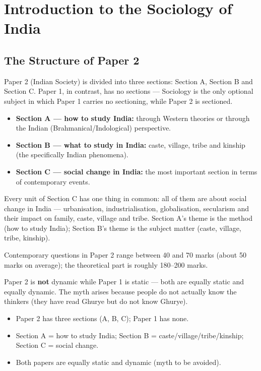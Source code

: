 \chapter{Introduction to the Sociology of India}

\section{The Structure of Paper 2}

Paper 2 (Indian Society) is divided into three sections: Section A, Section B and Section C. Paper 1, in contrast, has no sections --- Sociology is the only optional subject in which Paper 1 carries no sectioning, while Paper 2 is sectioned.

\begin{KeyConcept}
\begin{itemize}
\item \textbf{Section A --- how to study India:} through Western theories or through the Indian (Brahmanical/Indological) perspective.
\item \textbf{Section B --- what to study in India:} caste, village, tribe and kinship (the specifically Indian phenomena).
\item \textbf{Section C --- social change in India:} the most important section in terms of contemporary events.
\end{itemize}
\end{KeyConcept}

Every unit of Section C has one thing in common: all of them are about social change in India --- urbanisation, industrialisation, globalisation, secularism and their impact on family, caste, village and tribe. Section A's theme is the method (how to study India); Section B's theme is the subject matter (caste, village, tribe, kinship).

\begin{DataFact}
Contemporary questions in Paper 2 range between 40 and 70 marks (about 50 marks on average); the theoretical part is roughly 180--200 marks.
\end{DataFact}

\begin{CriticalPoint}
Paper 2 is \textbf{not} dynamic while Paper 1 is static --- both are equally static and equally dynamic. The myth arises because people do not actually know the thinkers (they have read Ghurye but do not know Ghurye).
\end{CriticalPoint}

\begin{QuickRevision}
\begin{itemize}
\item Paper 2 has three sections (A, B, C); Paper 1 has none.
\item Section A = how to study India; Section B = caste/village/tribe/kinship; Section C = social change.
\item Both papers are equally static and dynamic (myth to be avoided).
\end{itemize}
\end{QuickRevision}


